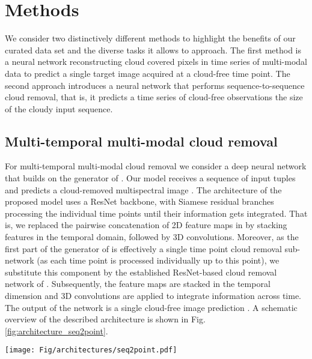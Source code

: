 \documentclass[journal]{IEEEtran}
\begin{document}
\section{Methods} \label{methods}

We consider two distinctively different methods to highlight the benefits of our curated data set and the diverse tasks it allows to approach. The first method is a neural network reconstructing cloud covered pixels in time series of multi-modal data to predict a single target image acquired at a cloud-free time point. The second approach introduces a neural network that performs sequence-to-sequence cloud removal, that is, it predicts a time series of cloud-free observations the size of the cloudy input sequence.

\subsection{Multi-temporal multi-modal cloud removal}\label{method:seq2point}

For multi-temporal multi-modal cloud removal we consider a deep neural network that builds on the generator of \cite{Sarukkai_Jain_Uzkent_Ermon_2019}. Our model receives a sequence of  input tuples  and predicts a cloud-removed multispectral image . The architecture of the proposed model uses a ResNet \cite{he2016deep} backbone, with Siamese residual branches processing the individual time points until their information gets integrated. That is, we replaced the pairwise concatenation of 2D feature maps in \cite{Sarukkai_Jain_Uzkent_Ermon_2019} by stacking features in the temporal domain, followed by 3D convolutions. Moreover, as the first part of the generator of \cite{Sarukkai_Jain_Uzkent_Ermon_2019} is effectively a single time point cloud removal sub-network (as each time point is processed individually up to this point), we substitute this component by the established ResNet-based \cite{he2016deep} cloud removal network of \cite{meraner2020cloud}. Subsequently, the feature maps are stacked in the temporal dimension and 3D convolutions are applied to integrate information across time. The output of the network is a single cloud-free image prediction . A schematic overview of the described architecture is shown in Fig. \ref{fig:architecture_seq2point}.


\begin{figure*}[h!tb] \texttt{[image: Fig/architectures/seq2point.pdf]}
    \caption{A conceptual illustration of the sequence-to-point cloud removal architecture . The network is based on the architecture of \cite{Sarukkai_Jain_Uzkent_Ermon_2019} and consists of  siamese ResNet branches \cite{meraner2020cloud} doing single time point cloud removal on  individual time points. Subsequently, the feature maps are stacked in the temporal dimension and 3D convolutions are applied to integrate information across time. The output of the network is a single cloud-free image prediction.}
    \label{fig:architecture_seq2point}
\end{figure*}
\end{document}
